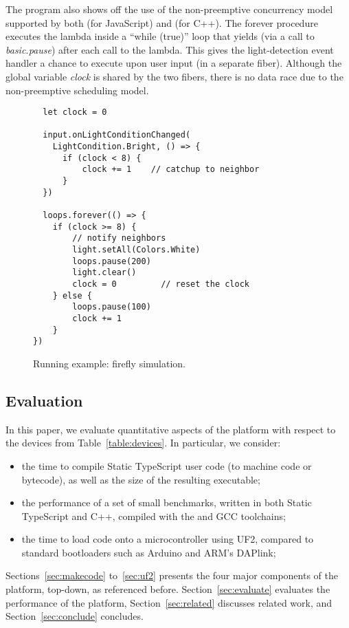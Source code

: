 The program also shows off the use of the non-preemptive concurrency
model supported by both \MC (for JavaScript) and \CO (for C++).
The forever procedure executes the lambda inside a ``while (true)''
loop that yields (via a call to \emph{basic.pause}) after each call to the lambda.
This gives the light-detection event handler a chance to execute
upon user input (in a separate fiber). Although the global variable \emph{clock} is
shared by the two fibers, there is no data race due to the non-preemptive
scheduling model.

\begin{figure}
\begin{lstlisting}
  let clock = 0

  input.onLightConditionChanged(
    LightCondition.Bright, () => {
      if (clock < 8) {
          clock += 1    // catchup to neighbor
      }
  })

  loops.forever(() => {
    if (clock >= 8) {
        // notify neighbors
        light.setAll(Colors.White)  
        loops.pause(200)
        light.clear()
        clock = 0         // reset the clock
    } else {
        loops.pause(100)
        clock += 1         
    }
})
\end{lstlisting}
\caption{\label{fig:example}Running example: firefly simulation.}
\end{figure}


\subsection{Evaluation}

In this paper, we evaluate quantitative aspects of the platform
with respect to the devices from Table~\ref{table:devices}. In particular, we
consider:
\begin{itemize}
\item the time to compile Static TypeScript user code (to machine code or bytecode),
       as well as the size of the resulting executable;
\item the performance of a set of small benchmarks, written in both Static TypeScript and C++,
      compiled with the \MC and GCC toolchains;
\item the time to load code onto a microcontroller using UF2, compared to standard bootloaders
      such as Arduino and ARM's DAPlink;
\end{itemize}


Sections~\ref{sec:makecode} to~\ref{sec:uf2} presents the four major components of the platform, top-down,
as referenced before. Section~\ref{sec:evaluate} evaluates the performance of the platform,
Section~\ref{sec:related} discusses related work, and Section~\ref{sec:conclude}
concludes.

